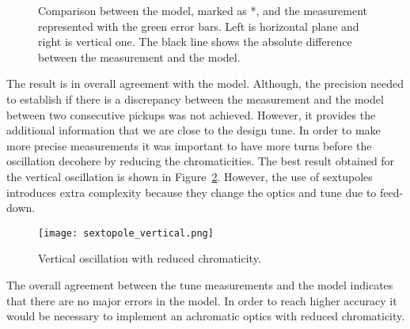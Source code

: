 \begin{figure}[!h]
\centering
{}
\caption[Phase advance]
{Comparison between the model, marked as *, 
and the measurement represented with the green error bars.
Left is horizontal plane and right is vertical one.
The black line shows the absolute difference between the measurement 
and the model. \label{fig:phaseAdv}}
\end{figure}
 

The result is in overall agreement with the model. 
Although, the precision needed to establish if there is a discrepancy 
between the measurement and the model between two consecutive pickups was not achieved. 
However, it provides the additional information that we are close to the design tune. 
In order to make more precise measurements it was important 
to have more turns before the oscillation decohere by reducing the chromaticities.
The best result obtained for the vertical oscillation is shown in 
Figure~\ref{fig:tune:sextopole_vertical}. 
However, the use of sextupoles introduces extra complexity
because they change the optics and tune due to feed-down.

\begin{figure}[!h]
\centering
\texttt{[image: sextopole\_vertical.png]}
\caption{Vertical oscillation with reduced chromaticity.  \label{fig:tune:sextopole_vertical}}
\end{figure}
 
The overall agreement between the tune measurements and 
the model indicates that there are no major errors in the model. 
In order to reach higher accuracy it would be necessary to implement 
an achromatic optics with reduced chromaticity.
 
